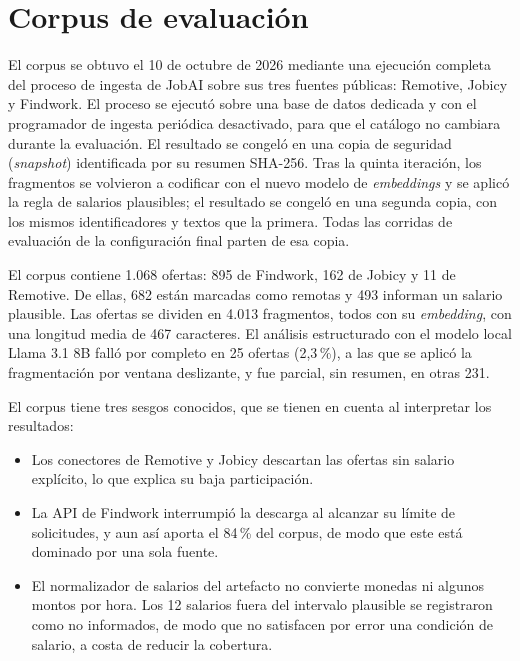 \section{Corpus de evaluación}
\label{sec:met-corpus}

El corpus se obtuvo el 10 de octubre de 2026 mediante una ejecución completa del proceso de ingesta de JobAI sobre sus tres fuentes públicas: Remotive, Jobicy y Findwork. El proceso se ejecutó sobre una base de datos dedicada y con el programador de ingesta periódica desactivado, para que el catálogo no cambiara durante la evaluación. El resultado se congeló en una copia de seguridad (\textit{snapshot}) identificada por su resumen SHA-256. Tras la quinta iteración, los fragmentos se volvieron a codificar con el nuevo modelo de \textit{embeddings} y se aplicó la regla de salarios plausibles; el resultado se congeló en una segunda copia, con los mismos identificadores y textos que la primera. Todas las corridas de evaluación de la configuración final parten de esa copia.

El corpus contiene 1.068 ofertas: 895 de Findwork, 162 de Jobicy y 11 de Remotive. De ellas, 682 están marcadas como remotas y 493 informan un salario plausible. Las ofertas se dividen en 4.013 fragmentos, todos con su \textit{embedding}, con una longitud media de 467 caracteres. El análisis estructurado con el modelo local Llama 3.1 8B falló por completo en 25 ofertas (2,3\,\%), a las que se aplicó la fragmentación por ventana deslizante, y fue parcial, sin resumen, en otras 231.

El corpus tiene tres sesgos conocidos, que se tienen en cuenta al interpretar los resultados:
\begin{itemize}
    \item Los conectores de Remotive y Jobicy descartan las ofertas sin salario explícito, lo que explica su baja participación.
    \item La API de Findwork interrumpió la descarga al alcanzar su límite de solicitudes, y aun así aporta el 84\,\% del corpus, de modo que este está dominado por una sola fuente.
    \item El normalizador de salarios del artefacto no convierte monedas ni algunos montos por hora. Los 12 salarios fuera del intervalo plausible se registraron como no informados, de modo que no satisfacen por error una condición de salario, a costa de reducir la cobertura. 
\end{itemize}

